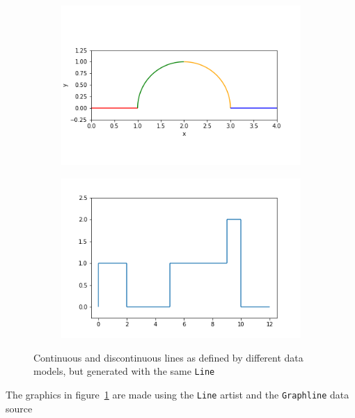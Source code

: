 \documentclass[../main.tex]{subfiles}
\begin{document}
\begin{figure}[H]
    \begin{subfigure}{0.5\textwidth}
        \includegraphics[width=\textwidth]{figures/code/linec_1.png}
    \end{subfigure}
    \begin{subfigure}{0.5\textwidth}
        \includegraphics[width=\textwidth]{figures/code/lined_1.png}
    \end{subfigure}
    \caption{Continuous and discontinuous lines as defined by different data models, but generated with the same \vartisteq \texttt{Line}}
    \label{fig:circle_step}
\end{figure}

The graphics in figure~\ref{fig:circle_step} are made using the \texttt{Line} artist and the \texttt{Graphline} data source
\end{document}
